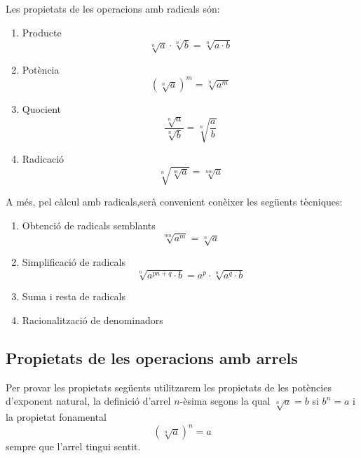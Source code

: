 Les propietats de les operacions amb radicals són:

\begin{enumerate}
\item Producte%
\begin{equation*}
\sqrt[n]{a}\cdot \sqrt[n]{b}=\sqrt[n]{a\cdot b}
\end{equation*}

\item Potència%
\begin{equation*}
\left( \sqrt[n]{a}\right) ^{m}=\sqrt[n]{a^{m}}
\end{equation*}

\item Quocient%
\begin{equation*}
\frac{\sqrt[n]{a}}{\sqrt[n]{b}}=\sqrt[n]{\frac{a}{b}}
\end{equation*}

\item Radicació%
\begin{equation*}
\sqrt[n]{\sqrt[m]{a}}=\sqrt[nm]{a}
\end{equation*}
\end{enumerate}

A més, pel càlcul amb radicals,serà convenient conèixer
les següents tècniques:

\begin{enumerate}
\item Obtenció de radicals semblants%
\begin{equation*}
\sqrt[mn]{a^{m}}=\sqrt[n]{a}
\end{equation*}

\item Simplificació de radicals%
\begin{equation*}
\sqrt[n]{a^{pn+q}\cdot b}=a^{p}\cdot \sqrt[n]{a^{q}\cdot b}
\end{equation*}

\item Suma i resta de radicals

\item Racionalització de denominadors
\end{enumerate}

\subsection{Propietats de les operacions amb arrels}

Per provar les propietats següents utilitzarem les propietats de les
potències d’exponent natural, la definició d’arrel $n$-èsima
segons la qual $\sqrt[n]{a}=b$ si $b^{n}=a$ i la propietat fonamental%
\begin{equation*}
\left( \sqrt[n]{a}\right) ^{n}=a
\end{equation*}%
sempre que l’arrel tingui sentit.

